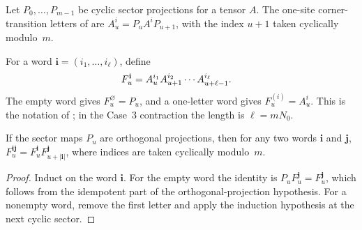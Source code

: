 \begin{definition}
    \label{def:periodic_corner_letter}
    \leanok
    Let $P_0,\ldots,P_{m-1}$ be cyclic sector projections for a tensor $A$.
    The one-site corner-transition letters of
    \cite[Appendix~A]{DeLasCuevas2017Irreducible} are
    $A_u^i=P_u A^i P_{u+1}$, with the index $u+1$ taken cyclically
    modulo~$m$.
\end{definition}

\begin{definition}
    \label{def:periodic_corner_product}
    \leanok
    For a word $\mathbf i=(i_1,\ldots,i_\ell)$, define
    \begin{align}
        F_u^{\mathbf i}
         & =
        A_u^{i_1}A_{u+1}^{i_2}\cdots A_{u+\ell-1}^{i_\ell}.
        \notag
    \end{align}
    The empty word gives $F_u^\varnothing=P_u$, and a one-letter word gives
    $F_u^{(i)}=A_u^i$. This is the notation of
    \cite[Appendix~A]{DeLasCuevas2017Irreducible}; in the Case~3 contraction
    the length is $\ell=mN_0$.
\end{definition}

\begin{lemma}
    \label{lem:periodic_corner_product_append}
    \leanok
    If the sector maps $P_u$ are orthogonal projections, then for any two
    words $\mathbf i$ and $\mathbf j$,
    $F_u^{\mathbf i\mathbf j}
        =F_u^{\mathbf i}F_{u+|\mathbf i|}^{\mathbf j}$, where indices are taken
    cyclically modulo~$m$.
\end{lemma}

\begin{proof}\leanok
    Induct on the word $\mathbf i$. For the empty word the identity is
    $P_uF_u^{\mathbf j}=F_u^{\mathbf j}$, which follows from the idempotent
    part of the orthogonal-projection hypothesis. For a nonempty word, remove
    the first letter and apply the induction hypothesis at the next cyclic
    sector.
\end{proof}

